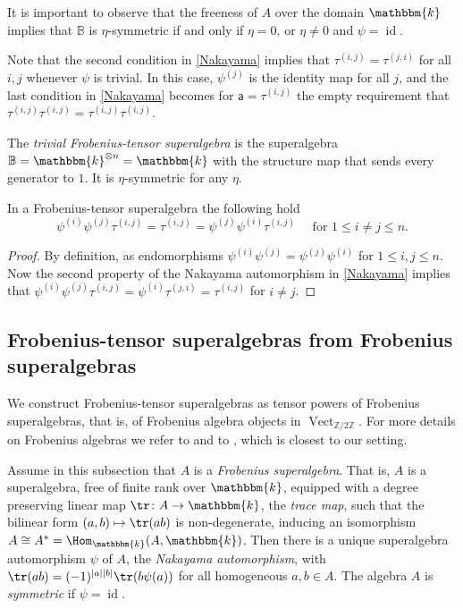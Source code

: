 \documentclass[a4paper,11pt]{amsart}
\numberwithin{equation}{subsection}
\theoremstyle{definition}
\theoremstyle{theorem}
\theoremstyle{remark}
\newcommand\Ztwo{\mathbb{Z}/2\mathbb{Z}}
\newcommand\ba{\mathsf{a}}
\newcommand\op{\operatorname}
\newcommand\taui[1][i]{\tau^{(#1)}}
\newcommand\kk{\mathbbm{k}}
\newcommand{\Bo}{\mathbb{B}}
\begin{document}
\begin{Remark}\label{rketasymm}
It is important to observe that the freeness of $A$ over the domain $\kk$ implies that $\Bo$ is
$\eta$-symmetric if and only if $\eta=0$, or $\eta\ne0$ and $\psi=\op{id}$.
\end{Remark}

\begin{Remark}
Note that the second condition in
\autoref{Nakayama} implies that $\taui[i,j]=\taui[j,i]$ for all $i,j$
whenever $\psi$ is trivial. In this case, $\psi^{(j)}$ is the identity map for
all $j$, and  the last condition in \autoref{Nakayama} becomes for
$\ba=\taui[i,j]$ the empty requirement that
$\taui[i,j]\taui[i,j]=\taui[i,j]\taui[i,j]$.
\end{Remark}


\begin{Example}\label{trivFrobtensor}
The  \emph{trivial Frobenius-tensor superalgebra} is the superalgebra $\Bo=\kk^{\otimes n}=\kk$ with the structure map that sends every generator to
 $1$. It is $\eta$-symmetric for any $\eta$.
\end{Example}

\begin{Lemma}\label{afterGluehwein}
In a Frobenius-tensor superalgebra the following hold
\[\psi^{(i)}\psi^{(j)}\tau^{(i,j)}=\tau^{(i,j)}=\psi^{(j)}\psi^{(i)}\tau^{(i,j)}\quad \text{ for $1\leq i\not=j\leq n$.}\]
\end{Lemma}
\begin{proof}By definition, as endomorphisms
$\psi^{(i)}\psi^{(j)}=\psi^{(j)}\psi^{(i)}$ for $1\leq i,j\leq n$.
Now the second property of the Nakayama automorphism in
\autoref{Nakayama} implies that $\psi^{(i)}\psi^{(j)}\tau^{(i,j)}= \psi^{(i)}\tau^{(j,i)}=\tau^{(i,j)}$ for $i\not=j$.
\end{proof}


  \subsection{Frobenius-tensor superalgebras from Frobenius superalgebras}\label{S:Frobeniusalgs}
We construct Frobenius-tensor superalgebras as tensor powers of
Frobenius superalgebras, that is, of Frobenius algebra objects in $\op{Vect}_{\Ztwo}$. For more details on Frobenius algebras we
refer to \cite{Kock, Skowronski} and to \cite{Savage:AffineWreath}, which is closest to our setting.

Assume in this subsection that $A$ is a \emph{Frobenius superalgebra}. That is, $A$ is a superalgebra,
free of finite rank over $\kk$, equipped with a degree preserving linear map $\tr\colon A\to\kk$,
the \emph{trace map}, such that the bilinear form $(a,b)\mapsto\tr(ab)$ is non-degenerate, inducing an isomorphism $A\cong A^*=\Hom_\kk(A,\kk)$. Then
there is a unique superalgebra automorphism $\psi$ of $A$, the \emph{Nakayama automorphism}, with
$\tr(ab)=(-1)^{|a||b|}\tr(b\psi(a))$ for all homogeneous $a,b\in A$. The algebra $A$ is
\emph{symmetric} if $\psi=\op{id}$.
\end{document}
